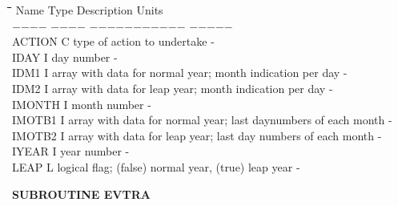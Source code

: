 \documentclass[11pt]{article}
\begin{document}
\begin{tabbing}
\hspace{1.27cm}\=\hspace{1.27cm}\=\hspace{1.27cm}\=\hspace{1.27cm}\=%
\hspace{1.27cm}\=\hspace{1.27cm}\=\hspace{1.27cm}\=\hspace{1.27cm}\=%
\hspace{1.27cm}\=\hspace{1.27cm}\=\kill
Name    \> \> Type   \> Description                                        \> \> \> \> \> \> \> Units\\
$-$$-$$-$$-$    \> \> $-$$-$$-$$-$   \> $-$$-$$-$$-$$-$$-$$-$$-$$-$$-$$-$                                        \> \> \> \> \> \> \> $-$$-$$-$$-$$-$\\
ACTION\> \> C\> type of action to undertake\> \> \> \> \> \> \> -\\
IDAY\> \> I\> day number\> \> \> \> \> \> \> -\\
IDM1\> \> I\> array with data for normal year; month indication per day\> \> \> \> \> \> \> -\\
IDM2\> \> I\> array with data for leap year; month indication per day\> \> \> \> \> \> \> -\\
IMONTH\> \> I\> month number\> \> \> \> \> \> \> -\\
IMOTB1\> \> I\> array with data for normal year; last daynumbers of each month\> \> \> \> \> \> \> -\\
IMOTB2\> \> I\> array with data for leap year; last day numbers of each month\> \> \> \> \> \> \> -\\
IYEAR\> \> I\> year number\> \> \> \> \> \> \> -\\
LEAP\> \> L\> logical flag; (false) normal year, (true) leap year\> \> \> \> \> \> \> -
\end{tabbing}

\bigskip
\bigskip
{\bf SUBROUTINE EVTRA}
\testlastline
\end{document}
